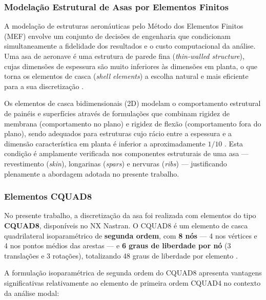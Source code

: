 \documentclass[a4paper,fleqn,noprintline]{cas-dc}
\begin{document}
\subsubsection{Modelação Estrutural de Asas por Elementos Finitos}

A modelação de estruturas aeronáuticas pelo Método dos Elementos Finitos (MEF) envolve um conjunto de decisões de engenharia que condicionam simultaneamente a fidelidade dos resultados e o custo computacional da análise. Uma asa de aeronave é uma estrutura de parede fina (\textit{thin-walled structure}), cujas dimensões de espessura são muito inferiores às dimensões em planta, o que torna os elementos de casca (\textit{shell elements}) a escolha natural e mais eficiente para a sua discretização \cite{Bathe2014, Cook2001}.

Os elementos de casca bidimensionais (2D) modelam o comportamento estrutural de painéis e superfícies através de formulações que combinam rigidez de membrana (comportamento no plano) e rigidez de flexão (comportamento fora do plano), sendo adequados para estruturas cujo rácio entre a espessura e a dimensão característica em planta é inferior a aproximadamente $1/10$ \cite{Zienkiewicz2005}. Esta condição é amplamente verificada nos componentes estruturais de uma asa --- revestimento (\textit{skin}), longarinas (\textit{spars}) e nervuras (\textit{ribs}) --- justificando plenamente a abordagem adotada no presente trabalho.

\subsubsection{Elementos CQUAD8}

No presente trabalho, a discretização da asa foi realizada com elementos do tipo \textbf{CQUAD8}, disponíveis no NX Nastran. O CQUAD8 é um elemento de casca quadrilateral isoparamétrico de \textbf{segunda ordem}, com \textbf{8 nós} --- 4 nos vértices e 4 nos pontos médios das arestas --- e \textbf{6 graus de liberdade por nó} (3 translações e 3 rotações), totalizando 48 graus de liberdade por elemento \cite{Nastran2014, Cook2001}.

A formulação isoparamétrica de segunda ordem do CQUAD8 apresenta vantagens significativas relativamente ao elemento de primeira ordem CQUAD4 no contexto da análise modal:
\end{document}
